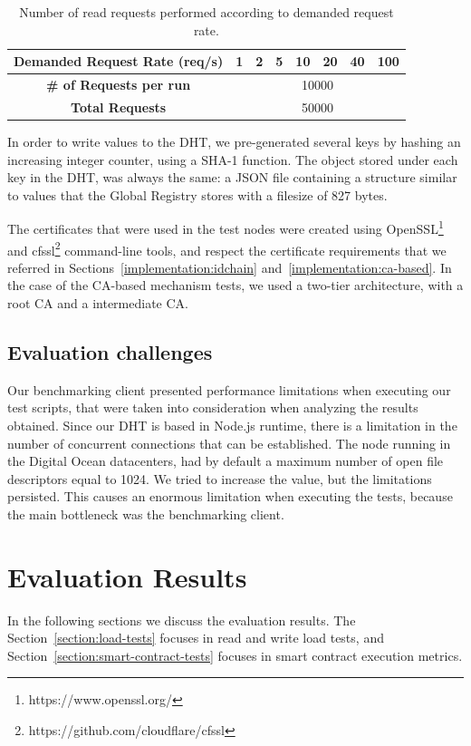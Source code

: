 \begin{table}[htb]
\centering
\begin{tabular}{cccccccc}
  \textbf{Demanded Request Rate (req/s)} & 1 & 2 & 5 & 10 & 20 & 40 & 100 \\ \hline
  \textbf{\# of Requests per run} & \multicolumn{7}{c}{10000} \\ \hline
  \textbf{Total Requests} & \multicolumn{7}{c}{50000} \\ \hline
\end{tabular}
\caption{Number of read requests performed according to demanded request rate.}
\label{table:total-requests-demanded-rate-reads}
\end{table}

In order to write values to the DHT, we pre-generated several keys by hashing an increasing integer counter, using a SHA-1 function.
The object stored under each key in the DHT, was always the same: a JSON file containing a structure similar to values that the Global Registry stores with a filesize of 827 bytes.

The certificates that were used in the test nodes were created using OpenSSL\footnote{https://www.openssl.org/} and cfssl\footnote{https://github.com/cloudflare/cfssl} command-line tools, and respect the certificate requirements that we referred in Sections~\ref{implementation:idchain} and~\ref{implementation:ca-based}.
In the case of the CA-based mechanism tests, we used a two-tier architecture, with a root CA and a intermediate CA.

\subsection{Evaluation challenges}

Our benchmarking client presented performance limitations when executing our test scripts, that were taken into consideration when analyzing the results obtained.
Since our DHT is based in Node.js runtime, there is a limitation in the number of concurrent connections that can be established.
The node running in the Digital Ocean datacenters, had by default a maximum number of open file descriptors equal to 1024.
We tried to increase the value, but the limitations persisted.
This causes an enormous limitation when executing the tests, because the main bottleneck was the benchmarking client.

\section{Evaluation Results}
\label{section:results}
In the following sections we discuss the evaluation results.
The Section~\ref{section:load-tests} focuses in read and write load tests, and Section~\ref{section:smart-contract-tests} focuses in smart contract execution metrics.

